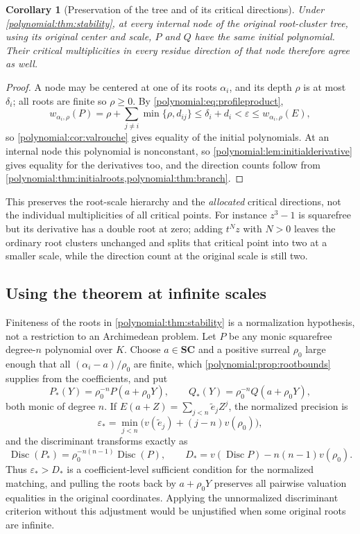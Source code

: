 \documentclass[11pt,letterpaper]{article}
\numberwithin{equation}{section}
\newtheorem{corollary}[theorem]{Corollary}
\theoremstyle{definition}
\theoremstyle{remark}\newtheorem{remark}[theorem]{Remark}
\newcommand{\SC}{\mathbf{SC}}
\newcommand{\Disc}{\operatorname{Disc}}
\begin{document}
\begin{corollary}[Preservation of the tree and of its critical directions]
\label{polynomial:cor:treestability}
Under \cref{polynomial:thm:stability}, at every internal node of the original
root-cluster tree, using its original center and scale, $P$ and $Q$ have the
same initial polynomial. Their critical multiplicities in every residue
direction of that node therefore agree as well.
\end{corollary}
\begin{proof}
A node may be centered at one of its roots $\alpha_i$, and its depth $\rho$ is
at most $\delta_i$; all roots are finite so $\rho\ge0$. By
\eqref{polynomial:eq:profileproduct},
\[
 w_{\alpha_i,\rho}(P)=\rho+\sum_{j\ne i}\min\{\rho,d_{ij}\}
 \le\delta_i+d_i<\varepsilon\le w_{\alpha_i,\rho}(E),
\]
so \cref{polynomial:cor:valrouche} gives equality of the initial polynomials.
At an internal node this polynomial is nonconstant, so
\cref{polynomial:lem:initialderivative} gives equality for the derivatives
too, and the direction counts follow from
\cref{polynomial:thm:initialroots,polynomial:thm:branch}.
\end{proof}

This preserves the root-scale hierarchy and the \emph{allocated} critical
directions, not the individual multiplicities of all critical points. For
instance $z^3-1$ is squarefree but its derivative has a double root at zero;
adding $t^Nz$ with $N>0$ leaves the ordinary root clusters unchanged and
splits that critical point into two at a smaller scale, while the direction
count at the original scale is still two.

\subsection{Using the theorem at infinite scales}\label{polynomial:subsec:rescaled}
Finiteness of the roots in \cref{polynomial:thm:stability} is a normalization
hypothesis, not a restriction to an Archimedean problem. Let $P$ be any monic
squarefree degree-$n$ polynomial over $K$. Choose $a\in\SC$ and a positive
surreal $\rho_0$ large enough that all $(\alpha_i-a)/\rho_0$ are finite, which
\cref{polynomial:prop:rootbounds} supplies from the coefficients, and put
\[
 P_*(Y)=\rho_0^{-n}P(a+\rho_0Y),\qquad Q_*(Y)=\rho_0^{-n}Q(a+\rho_0Y),
\]
both monic of degree $n$. If $E(a+Z)=\sum_{j<n}\widetilde e_jZ^j$, the
normalized precision is
\begin{equation}\label{polynomial:eq:rescaledmu}
 \varepsilon_*=\min_{j<n}\bigl(v(\widetilde e_j)+(j-n)v(\rho_0)\bigr),
\end{equation}
and the discriminant transforms exactly as
\begin{equation}\label{polynomial:eq:rescaleddisc}
 \Disc(P_*)=\rho_0^{-n(n-1)}\Disc(P),\qquad
 D_*=v(\Disc P)-n(n-1)v(\rho_0).
\end{equation}
Thus $\varepsilon_*>D_*$ is a coefficient-level sufficient condition for the
normalized matching, and pulling the roots back by $a+\rho_0Y$ preserves all
pairwise valuation equalities in the original coordinates. Applying the
unnormalized discriminant criterion without this adjustment would be
unjustified when some original roots are infinite.
\end{document}

